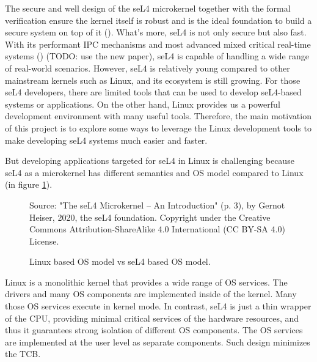 The secure and well design of the seL4 microkernel together with the formal verification ensure the kernel itself is robust and is the ideal foundation to build a secure system on top of it (\cite{Klein_AEHCDEEKNSTW_10}). What's more, seL4 is not only secure but also fast. With its performant IPC mechanisms and most advanced mixed critical real-time systems (\cite{Lyons_Heiser_14}) (TODO: use the new paper), seL4 is capable of handling a wide range of real-world scenarios. However, seL4 is relatively young compared to other mainstream kernels such as Linux, and its ecosystem is still growing. For those seL4 developers, there are limited tools that can be used to develop seL4-based systems or applications. On the other hand, Linux provides us a powerful development environment with many useful tools. Therefore, the main motivation of this project is to explore some ways to leverage the Linux development tools to make developing seL4 systems much easier and faster.

But developing applications targeted for seL4 in Linux is challenging because seL4 as a microkernel has different semantics and OS model compared to Linux (in figure \ref{fig:osmodel}).

\begin{figure}[h] %
    \centering
    {Source: "The seL4 Microkernel – An Introduction" (p. 3), by Gernot Heiser, 2020, the seL4 foundation. Copyright  under the Creative Commons Attribution-ShareAlike 4.0 International (CC BY-SA 4.0) License.}
    
    \caption{Linux based OS model vs seL4 based OS model.}
    \label{fig:osmodel}
\end{figure}

Linux is a monolithic kernel that provides a wide range of OS services. The drivers and many OS components are implemented inside of the kernel. Many those OS services execute in kernel mode. In contrast, seL4 is just a thin wrapper of the CPU, providing minimal critical services of the hardware resources, and thus it guarantees strong isolation of different OS components. The OS services are implemented at the user level as separate components. Such design minimizes the TCB. 

